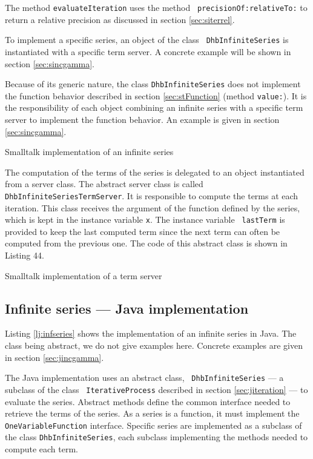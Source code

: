 \documentclass[twoside]{book}
\begin{document}
The method {\tt evaluateIteration} uses the method {\tt
precisionOf:relativeTo:} to return a relative precision as
discussed in section \ref{sec:siterrel}.

To implement a specific series, an object of the class {\tt
DhbInfiniteSeries} is instantiated with a specific term server. A
concrete example will be shown in section \ref{sec:sincgamma}.

Because of its generic nature, the class {\tt DhbInfiniteSeries}
does not implement the function behavior described in section
\ref{sec:stFunction} (method {\tt value:}). It is the
responsibility of each object combining an infinite series with a
specific term server to implement the function behavior. An
example is given in section \ref{sec:sincgamma}.
\begin{listing} Smalltalk implementation of an infinite series \label{ls:infseries}

\end{listing}
The computation of the terms of the series is delegated to an
object instantiated from a server class. The abstract server class
is called {\tt DhbInfiniteSeriesTermServer}. It is responsible to
compute the terms at each iteration. This class receives the
argument of the function defined by the series, which is kept in
the instance variable {\tt x}. The instance variable {\tt
lastTerm} is provided to keep the last computed term since the
next term can often be computed from the previous one. The code of
this abstract class is shown in Listing 44.
\begin{listing} Smalltalk implementation of a term server \label{ls:termserver}

\end{listing}

\subsection{Infinite series --- Java  implementation}
 Listing \ref{lj:infseries} shows the
implementation of an infinite series in Java. The class being
abstract, we do not give examples here. Concrete examples are
given in section \ref{sec:jincgamma}.

The Java implementation uses an abstract class, {\tt
DhbInfiniteSeries} --- a subclass of the class {\tt
IterativeProcess} described in section \ref{sec:jiteration} --- to
evaluate the series. Abstract methods define the common interface
needed to retrieve the terms of the series. As a series is a
function, it must implement the {\tt OneVariableFunction}
interface. Specific series are implemented as a subclass of the
class {\tt DhbInfiniteSeries}, each subclass implementing the
methods needed to compute each term.
\end{document}
